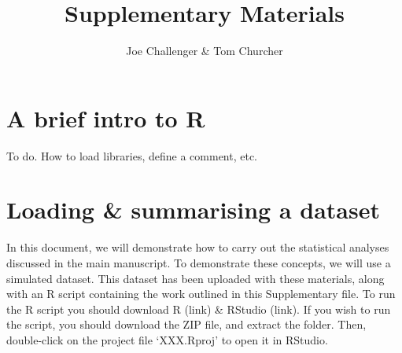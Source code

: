 \documentclass[11pt]{article}
\title{Supplementary Materials}
\author{Joe Challenger \& Tom Churcher}
\begin{document}
\maketitle

\section*{A brief intro to R}
To do. How to load libraries, define a comment, etc.

\section{Loading \& summarising a dataset}

In this document, we will demonstrate how to carry out the statistical analyses discussed in the main manuscript. To demonstrate these concepts, we will use a simulated dataset. This dataset has been uploaded with these materials, along with an R script containing the work outlined in this Supplementary file. To run the R script you should download R (link) \& RStudio (link). If you wish to run the script, you should download the ZIP file, and extract the folder. Then, double-click on the project file `XXX.Rproj' to open it in RStudio.
\end{document}
